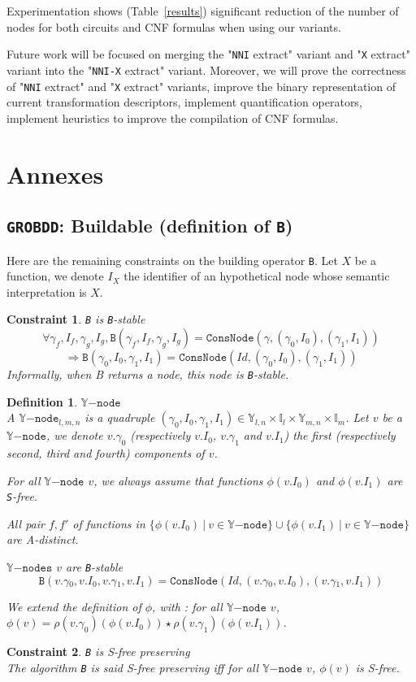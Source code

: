 \documentclass[a4paper,10pt]{article}
\newcommand{\Y}{\mathbb{Y}}
\newcommand{\I}{\mathbb{I}}
\newcommand{\Ynode}{\Y\mathtt{-node}}
\newcommand{\Ynodes}{\Y\mathtt{-nodes}}
\newcommand{\nniextract}{"\texttt{NNI} extract"}
\newcommand{\xextract}{"\texttt{X} extract"}
\newcommand{\GroBdd}{\texttt{GROBDD}}
\newcommand{\fieldGamma}{\mathtt{\gamma}}
\newtheorem{newdef}{Definition}
\newcommand{\definition}[2]{\begin{newdef}{#1\\}#2\end{newdef}}
\newtheorem{newcons}{Constraint}
\newcommand{\constraint}[2]{\begin{newcons}{#1\\}#2\end{newcons}}
\begin{document}
Experimentation shows (Table~\ref{results}) significant reduction of the number of nodes for both circuits \cite{BenchSatlib, BenchLgsynth91} and CNF formulas \cite{BenchIscas99} when using our variants.

Future work will be focused on merging the \nniextract{} variant and \xextract{} variant into the "\texttt{NNI-X} extract" variant.
Moreover, we will prove the correctness of \nniextract{} and \xextract{} variants, improve the binary representation of current transformation descriptors, implement quantification operators, implement heuristics to improve the compilation of CNF formulas.


\newpage
{}


\newpage
\tableofcontents

\newpage

\section{Annexes}

\subsection{\GroBdd{}: Buildable (definition of \texttt{B})\label{grobdd-B-constraints}}
Here are the remaining constraints on the building operator \texttt{B}.
Let $X$ be a function, we denote $I_X$ the identifier of an hypothetical node whose semantic interpretation is $X$.

\constraint{\texttt{B} is \texttt{B}-stable}
{\[\forall \gamma_f, I_f, \gamma_g, I_g, \mathtt{B}(\gamma_f, I_f, \gamma_g, I_g) = \mathtt{ConsNode}(\gamma, (\gamma_0, I_0), (\gamma_1, I_1))\]
\[\Rightarrow \mathtt{B}(\gamma_0, I_0, \gamma_1, I_1) = \mathtt{ConsNode}(Id, (\gamma_0, I_0), (\gamma_1, I_1))\]
Informally, when B returns a node, this node is \texttt{B}-stable.
}

\definition{$\Ynode$}
{A $\Ynode_{l, m, n}$ is a quadruple $(\gamma_0, I_0, \gamma_1, I_1) \in \Y_{l, n} \times \I_l \times \Y_{m, n} \times \I_m$.
Let $v$ be a $\Ynode$, we denote $v.\gamma_0$ (respectively $v.I_0$, $v.\gamma_1$ and $v.I_1$) the first (respectively second, third and fourth) components of $v$.
\begin{compactenum}
\item For all $\Ynode$ $v$, we always assume that functions $\phi(v.I_0)$ and $\phi(v.I_1)$ are \texttt{S}-free.
\item All pair $f, f'$ of functions in $\{\phi(v.I_0) ~|~ v \in\Ynode\} \cup \{\phi(v.I_1) ~|~ v\in\Ynode\}$ are A-distinct.
\item  $\Ynodes$ $v$ are \texttt{B}-stable
\[\mathtt{B}(v.\fieldGamma{}_0, v.I_0, v.\fieldGamma{}_1, v.I_1) = \mathtt{ConsNode}(Id, (v.\fieldGamma{}_0, v.I_0), (v.\fieldGamma{}_1, v.I_1))\]
\end{compactenum}
We extend the definition of $\phi$, with : for all $\Ynode$ $v$, $\phi(v) = \rho(v.\gamma_0)(\phi(v.I_0)) \star \rho(v.\gamma_1)(\phi(v.I_1))$.
}
\constraint{\texttt{B} is S-free preserving}
{The algorithm \texttt{B} is said S-free preserving iff for all $\Ynode$ $v$, $\phi(v)$ is S-free.}
\end{document}
